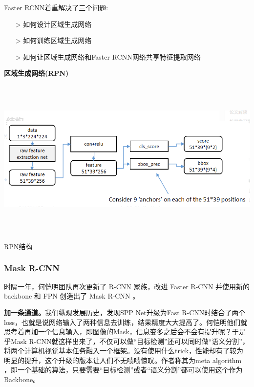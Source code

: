 Faster RCNN着重解决了三个问题:
\begin{itemize}
	\item[>] 如何设计区域生成网络
	\item[>] 如何训练区域生成网络
	\item[>] 如何让区域生成网络和Faster RCNN网络共享特征提取网络
\end{itemize}
\textbf{区域生成网络(RPN)}
\begin{uscfigure}
	\includegraphics[width=\textwidth,height=8cm]{./Pictures/rpn.png}	
	\caption{RPN结构}	
	\label{rpn-model}
\end{uscfigure}
\subsubsection{Mask R-CNN}
时隔一年，何恺明团队再次更新了 R-CNN 家族，改进 Faster R-CNN 并使用新的 backbone 和 FPN 创造出了 Mask R-CNN 。

\textbf{加一条通道。}我们纵观发展历史，发现SPP Net升级为Fast R-CNN时结合了两个loss，也就是说网络输入了两种信息去训练，结果精度大大提高了。何恺明他们就思考着再加一个信息输入，即图像的Mask，信息变多之后会不会有提升呢？于是乎Mask R-CNN就这样出来了，不仅可以做“目标检测”还可以同时做“语义分割”，将两个计算机视觉基本任务融入一个框架。没有使用什么trick，性能却有了较为明显的提升，这个升级的版本让人们不无啧啧惊叹。作者称其为meta algorithm ，即一个基础的算法，只要需要“目标检测”或者“语义分割”都可以使用这个作为Backbone。


